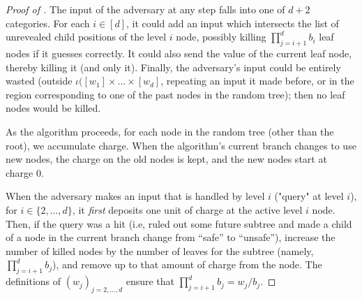 \documentclass[10pt,a4paper]{article}
\theoremstyle{definition}
\theoremstyle{remark}
\begin{document}
\begin{itemize}
\begin{itemize}
\begin{proof}[Proof of ]
  The input of the adversary at any step falls into one of $d + 2$ categories.
  For each $i \in [d]$, it could add an input which intersects the list
  of unrevealed child positions of the level $i$ node, possibly killing
  $\prod_{j=i + 1}^{d} b_i$ leaf nodes if it guesses correctly. It could
  also send the value of the current leaf 
  node, thereby killing it (and only it).
  Finally, the adversary's input could be entirely wasted (outside $\iota([w_1]\times\ldots\times[w_d]$, repeating an input it made before, or in
  the region corresponding to one of the past nodes in the random tree); then
  no leaf nodes would be killed.

  As the algorithm proceeds, for each node in the random tree (other than
  the root), we accumulate charge. When the algorithm's current branch changes
  to use new nodes, the charge on the old nodes is kept, and the new nodes
  start at charge $0$.
  
  When the adversary makes an input that is handled by level $i$ ("query" at level $i$),
  for $i \in \{2,\ldots,d\}$, it
  \emph{first} deposits one unit of charge at the active level $i$ node.
  Then, if the query was a hit (i.e, ruled out some future subtree and made
  a child of a node in the current branch change from ``safe'' to ``unsafe''), increase
  the number of killed nodes by the number of leaves for the subtree
  (namely, $\prod_{j={i+1}}^{d} b_j$), and remove up to that amount 
  of charge from the node. The definitions of $(w_j)_{j=2,\ldots,d}$ ensure
  that $\prod_{j={i+1}}^{d} b_j = w_j / b_j$.
  

\end{proof}
\end{itemize}
\end{itemize}
\end{document}
